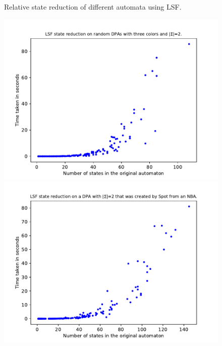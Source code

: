 \begin{figure}
\begin{minipage}{0.49\textwidth}
		\caption{Relative state reduction of different automata using LSF.}
		\label{exp:fig:lsf_reduct_prios}
	\end{minipage}
\end{figure}

\begin{figure}
	\centering
	\includegraphics[page=1,height=.3\textheight]{../data/analysis/lsf/gendet_ap1.pdf} 
	\includegraphics[page=1,height=.3\textheight]{../data/analysis/lsf/detspot_ap1.pdf} 

\end{figure}
